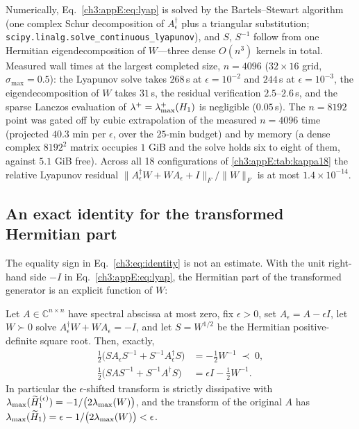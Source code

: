 Numerically, Eq.~\eqref{ch3:appE:eq:lyap} is solved by the
Bartels--Stewart algorithm (one complex Schur decomposition of
$A_\epsilon^{\dagger}$ plus a triangular substitution;
\texttt{scipy.linalg.solve\_continuous\_lyapunov}), and $S$, $S^{-1}$
follow from one Hermitian eigendecomposition of $W$---three dense
$O(n^{3})$ kernels in total.  Measured wall times at the largest
completed size, $n=4096$ ($32\times16$ grid,
$\sigma_{\max}=0.5$): the Lyapunov solve takes $268\,$s at
$\epsilon=10^{-2}$ and $244\,$s at $\epsilon=10^{-3}$, the
eigendecomposition of $W$ takes $31\,$s, the residual verification
$2.5$--$2.6\,$s, and the sparse Lanczos evaluation of
$\lambda^{+}=\lambda_{\max}^{+}(H_1)$ is negligible ($0.05\,$s).  The $n=8192$
point was gated off by cubic extrapolation of the measured $n=4096$
time (projected $40.3$ min per $\epsilon$, over the $25$-min budget)
and by memory (a dense complex $8192^{2}$ matrix occupies $1$ GiB and
the solve holds six to eight of them, against $5.1$ GiB free).  Across
all 18 configurations of \ref{ch3:appE:tab:kappa18} the relative
Lyapunov residual
$\lVert A_\epsilon^{\dagger}W+WA_\epsilon+I\rVert_F/\lVert W\rVert_F$
is at most $1.4\times10^{-14}$.

\subsection{An exact identity for the transformed Hermitian part}
\label{ch3:appE:exact}

The equality sign in Eq.~\eqref{ch3:eq:identity} is not an estimate.  With
the unit right-hand side $-I$ in Eq.~\eqref{ch3:appE:eq:lyap}, the
Hermitian part of the transformed generator is an explicit function of
$W$:

\begin{proposition}
\label{ch3:appE:prop}
Let $A\in\mathbb{C}^{n\times n}$ have spectral abscissa at most zero,
fix $\epsilon>0$, set $A_\epsilon=A-\epsilon I$, let $W\succ0$ solve
$A_\epsilon^{\dagger}W+WA_\epsilon=-I$, and let $S=W^{1/2}$ be the
Hermitian positive-definite square root.  Then, exactly,
\begin{align}
  \tfrac12\bigl(SA_\epsilon S^{-1}+S^{-1}A_\epsilon^{\dagger}S\bigr)
    &= -\tfrac12 W^{-1} \;\prec\; 0,
  \label{ch3:appE:eq:identshift}\\
  \tfrac12\bigl(SAS^{-1}+S^{-1}A^{\dagger}S\bigr)
    &= \epsilon I - \tfrac12 W^{-1}.
  \label{ch3:appE:eq:identorig}
\end{align}
In particular the $\epsilon$-shifted transform is strictly dissipative
with $\lambda_{\max}(\widetilde{H}_1^{(\epsilon)}) = -1/\bigl(2\lambda_{\max}(W)\bigr)$, and the
transform of the original $A$ has
$\lambda_{\max}(\widetilde{H}_1) = \epsilon - 1/\bigl(2\lambda_{\max}(W)\bigr) < \epsilon$.
\end{proposition}

